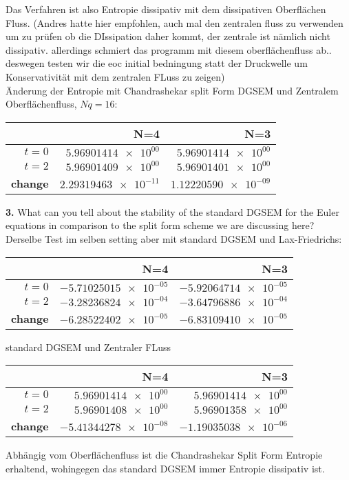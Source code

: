 \documentclass[11pt]{scrartcl}
\begin{document}
Das Verfahren ist also Entropie dissipativ mit dem dissipativen Oberflächen Fluss. (Andres hatte hier empfohlen, auch mal den zentralen fluss zu verwenden um zu prüfen ob die DIssipation daher kommt, der zentrale ist nämlich nicht dissipativ. allerdings schmiert das programm mit diesem oberflächenfluss ab.. deswegen testen wir die eoc initial bedningung statt der Druckwelle um Konservativität mit dem zentralen FLuss zu zeigen) \\
Änderung der Entropie mit Chandrashekar split Form DGSEM und Zentralem Oberflächenfluss, $Nq = 16$: 
\begin{table}[H]
\centering
\begin{tabular}{|r|r|r|}
    \hline\hline
     & \textbf{N=4} & \textbf{N=3} \\\hline
    \textbf{$t=0$} & $\num{5.96901414e+00}$ & $\num{5.96901414e+00}$ \\
    \textbf{$t=2$} &  $\num{5.96901409e+00}$ & $\num{5.96901401e+00}$ \\
    \textbf{change} & $\num{2.29319463e-11}$ & $\num{1.12220590e-09}$ \\\hline\hline
\end{tabular}
\end{table}

\textbf{3.} What can you tell about the stability of the standard DGSEM for the Euler equations in comparison to the split form scheme we are discussing here? \\
Derselbe Test im selben setting aber mit standard DGSEM und Lax-Friedrichs:
\begin{table}[H]
\centering
\begin{tabular}{|r|r|r|}
    \hline\hline
     & \textbf{N=4} & \textbf{N=3} \\\hline
    \textbf{$t=0$} & $\num{-5.71025015e-05}$ & $\num{-5.92064714e-05}$ \\
    \textbf{$t=2$} &  $\num{-3.28236824e-04}$ & $\num{-3.64796886e-04}$ \\
    \textbf{change} & $\num{-6.28522402e-05}$ & $\num{-6.83109410e-05}$ \\\hline\hline
\end{tabular}
\end{table}
standard DGSEM und Zentraler FLuss
\begin{table}[H]
\centering
\begin{tabular}{|r|r|r|}
    \hline\hline
     & \textbf{N=4} & \textbf{N=3} \\\hline
    \textbf{$t=0$} & $\num{5.96901414e+00}$ & $\num{5.96901414e+00}$ \\
    \textbf{$t=2$} &  $\num{5.96901408e+00}$ & $\num{5.96901358e+00}$ \\
    \textbf{change} & $\num{-5.41344278e-08}$ & $\num{-1.19035038e-06}$ \\\hline\hline
\end{tabular}
\end{table}
Abhängig vom Oberflächenfluss ist die Chandrashekar Split Form Entropie erhaltend, wohingegen das standard DGSEM immer Entropie dissipativ ist.\\
\end{document}
